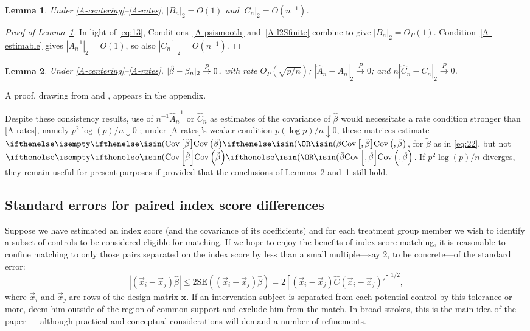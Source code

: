 \documentclass{article}
\newtheorem{lemma}{Lemma}
\theoremstyle{remark}
\begin{document}
\begin{lemma} \label{lem:C-rate}
  Under \ref{A-centering}--\ref{A-rates}, $|B_{n}|_{2} = O(1)$ and $|C_{n}|_{2} = O(n^{-1})$.
\end{lemma}

\begin{proof}[Proof of Lemma~\ref{lem:C-rate}]
  In light of \eqref{eq:13}, Conditions~\ref{A-psismooth} and~\ref{A-l2Sfinite} combine to give $|B_{n}|_{2} = O_{P}(1)$.  Condition~\ref{A-estimable} gives $|{A}_{n}^{-1}|_{2}=O(1)$, so also $|{C}_{n}^{-1}|_{2}=O(n^{-1})$.
\end{proof}


\begin{lemma} \label{lem:ChatC}
  Under \ref{A-centering}--\ref{A-rates}, $|\hat\beta - \beta_{n }|_{2} \stackrel{P}{\rightarrow} 0$, with rate $O_{P}\left( \sqrt{p/n} \right)$;   $|\hat{A}_{n} - A_{n}|_{2} \stackrel{P}{\rightarrow} 0$; and $n|\hat{C}_{n} - C_{n}|_{2} \stackrel{P}{\rightarrow} 0$. 
\end{lemma}

A proof, drawing from \citet{he2000parameters} and \citet{wang2011gee}, appears in the appendix.

Despite these consistency results, use of $n^{-1}\hat{A}_{n}^{-1}$ or $\hat{C}_{n}$ as estimates of the covariance of $\hat\beta$ would necessitate a rate condition stronger than \ref{A-rates}, namely $p^{2}\log(p)/n \downarrow 0$ \citep[Theorem~2.2]{he2000parameters}; under \ref{A-rates}'s weaker condition $p(\log p)/n \downarrow 0$, these matrices estimate $\Cov{\tilde{\beta}}$, for $\tilde\beta$ as in \eqref{eq:22}, but not $\Cov{\hat\beta}$.   If $p^{2}\log(p)/n$ diverges, they remain useful for present purposes if provided that the conclusions of Lemmas~\ref{lem:ChatC} and~\ref{lem:C-rate} still hold. 


\subsection{Standard errors for paired index score differences}
Suppose we have estimated an index score (and the covariance of its
coefficients) and for each treatment group member we wish to identify a
subset of controls to be considered eligible for matching. If we hope to
enjoy the benefits of index score matching, it is reasonable to
confine matching to only those pairs separated on the index score
by less than a small multiple---say 2, to be concrete---of the standard error:
\begin{equation}
|(\vec{x}_i - \vec{x}_j)\hat{\beta}| \leq 2 \mathrm{SE}\left( (\vec{x}_i - \vec{x}_j)\hat{\beta}\right) = 2\left[  (\vec{x}_i - \vec{x}_j)\hat{C}(\vec{x}_i - \vec{x}_j)' \right]^{1/2},
\label{eq:ipse-i}
\end{equation}
where $\vec{x}_i$ and $\vec{x}_j$ are rows of the design matrix
$\mathbf{x}$. If an intervention subject is separated from each
potential control by this tolerance or more, deem him outside of the
region of common support and exclude him from the match.  In broad
strokes, this is the main idea of the paper --- although practical and
conceptual considerations will demand a number of refinements.
\end{document}
